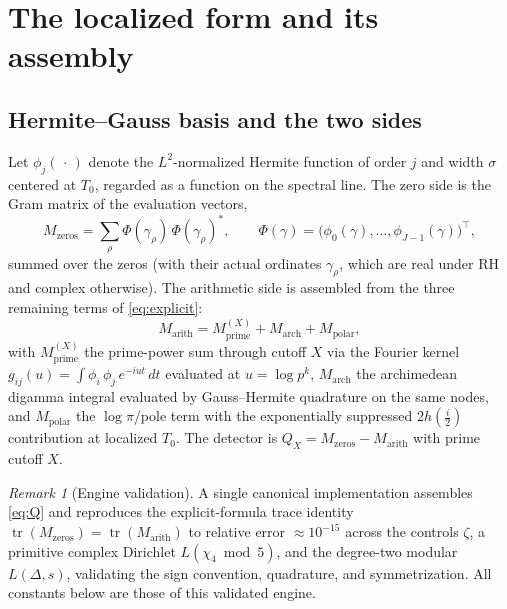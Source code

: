 \documentclass[11pt]{amsart}
\theoremstyle{definition}
\theoremstyle{remark}
\newtheorem{remark}[theorem]{Remark}
\newcommand{\tr}{\operatorname{tr}}
\begin{document}
\section{The localized form and its assembly}\label{sec:setup}

\subsection{Hermite--Gauss basis and the two sides}

Let $\phi_j(\,\cdot\,)$ denote the $L^2$-normalized Hermite function of order
$j$ and width $\sigma$ centered at $T_0$, regarded as a function on the
spectral line. The zero side is the Gram matrix of the evaluation vectors,
\begin{equation}\label{eq:Mzero}
  M_{\mathrm{zeros}} = \sum_{\rho}\Phi(\gamma_\rho)\,\Phi(\gamma_\rho)^{*},
  \qquad \Phi(\gamma)=\bigl(\phi_0(\gamma),\dots,\phi_{J-1}(\gamma)\bigr)^{\!\top},
\end{equation}
summed over the zeros (with their actual ordinates $\gamma_\rho$, which are
real under RH and complex otherwise). The arithmetic side is assembled from
the three remaining terms of \eqref{eq:explicit}:
\begin{equation}\label{eq:Marith}
  M_{\mathrm{arith}} = M_{\mathrm{prime}}^{(X)} + M_{\mathrm{arch}} + M_{\mathrm{polar}},
\end{equation}
with $M_{\mathrm{prime}}^{(X)}$ the prime-power sum through cutoff $X$ via
the Fourier kernel $g_{ij}(u)=\int \phi_i\,\phi_j\,e^{-iut}\,dt$ evaluated at
$u=\log p^{k}$, $M_{\mathrm{arch}}$ the archimedean digamma integral
evaluated by Gauss--Hermite quadrature on the same nodes, and
$M_{\mathrm{polar}}$ the $\log\pi$/pole term with the exponentially
suppressed $2h(\tfrac i2)$ contribution at localized $T_0$. The detector is
$Q_X=M_{\mathrm{zeros}}-M_{\mathrm{arith}}$ with prime cutoff $X$.

\begin{remark}[Engine validation]\label{rem:engine}
A single canonical implementation \cite{TrejoV8} assembles \eqref{eq:Q} and
reproduces the explicit-formula trace identity
$\tr(M_{\mathrm{zeros}})=\tr(M_{\mathrm{arith}})$ to relative error
$\approx10^{-15}$ across the controls $\zeta$, a primitive complex Dirichlet
$L(\chi_4\bmod5)$, and the degree-two modular $L(\Delta,s)$, validating the
sign convention, quadrature, and symmetrization. All constants below are
those of this validated engine.
\end{remark}
\end{document}
